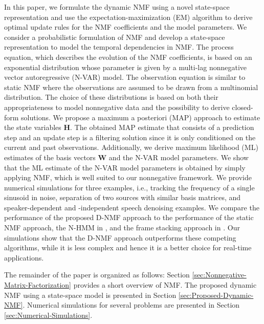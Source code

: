 \documentclass[10pt,twocolumn,twoside] {IEEEtran}
\begin{document}
In this paper, we formulate the dynamic NMF using a novel state-space representation and use the expectation-maximization (EM) algorithm to derive optimal update rules for the NMF coefficients and the model parameters.
We consider a probabilistic formulation of NMF \cite{Smaragdis2006}
and develop a state-space representation to model the temporal dependencies
in NMF. The process equation, which describes the evolution of the
NMF coefficients, is based on an exponential distribution whose parameter
is given by a multi-lag nonnegative vector autoregressive (N-VAR) model. The
observation equation is similar to static NMF where the
observations are assumed to be drawn from a multinomial distribution.
The choice of these distributions is based on both their appropriateness to model nonnegative data and the possibility
to derive closed-form solutions. We propose a maximum a posteriori
(MAP) approach to estimate the state variables $\mathbf{H}$. The
obtained MAP estimate that consists of a prediction step and an update step is a filtering solution since it is only conditioned
on the current and past observations. Additionally, we derive maximum
likelihood (ML) estimates of the basis vectors $\mathbf{W}$ and the
N-VAR model parameters. We show that the ML estimate of the N-VAR model parameters is obtained by simply applying NMF, which is well suited to
our nonnegative framework. We provide numerical simulations for three
examples, i.e., tracking the frequency of a single sinusoid in
noise, separation of two sources with similar basis matrices, and speaker-dependent and -independent speech denoising examples. We compare the performance of the proposed D-NMF approach to the performance of the static NMF approach, the N-HMM in \cite{Mysore2010}, and the frame stacking approach in \cite{Gemmeke2011a}. Our simulations show that the D-NMF approach outperforms these competing algorithms, while it is less complex and hence it is a better choice for real-time applications.

The remainder of the paper is organized as follows: Section \ref{sec:Nonnegative-Matrix-Factorization}
provides a short overview of NMF. The proposed dynamic NMF using a state-space model is presented in
Section \ref{sec:Proposed-Dynamic-NMF}. Numerical simulations for several problems
are presented in Section \ref{sec:Numerical-Simulations}.

\end{document}
